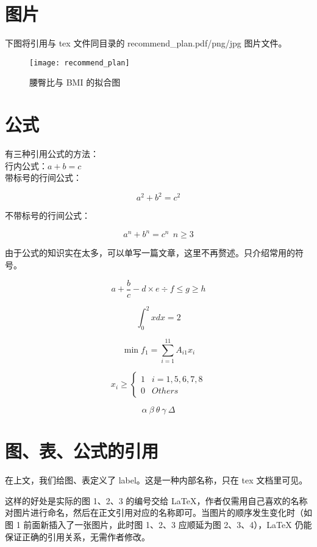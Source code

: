 \documentclass{article}
\begin{document}
\section{图片}

下图将引用与 tex 文件同目录的 recommend\_plan.pdf/png/jpg 图片文件。

\begin{figure}[!htbp]
	\centering
	\texttt{[image: recommend\_plan]}
	\caption{腰臀比与 BMI 的拟合图}
	\label{fig:whr-bmi}
\end{figure}

\section{公式}

有三种引用公式的方法：\\

行内公式：$a+b=c$\\

带标号的行间公式：

\begin{equation}
a^2 + b^2 = c^2
\label{gougu}
\end{equation}

不带标号的行间公式：

$$a^n+b^n=c^n \ \  n \geq 3$$

由于公式的知识实在太多，可以单写一篇文章，这里不再赘述。只介绍常用的符号。

$$a + \frac{b}{c} - d \times e \div f \leq g \geq h$$

$$\int_{0}^{2} xdx = 2$$

$$\min f_1 = \sum_{i=1}^{11} A_{i1}x_i$$

$$x_i \geq \begin{cases}
1 & i = 1, 5, 6, 7, 8\\
0 & Others
\end{cases}$$

$$\alpha \ \beta \ \theta \ \gamma \ \Delta$$


\section{图、表、公式的引用}

在上文，我们给图、表定义了 label。这是一种内部名称，只在 tex 文档里可见。

这样的好处是实际的图 1、2、3 的编号交给 LaTeX，作者仅需用自己喜欢的名称对图片进行命名，然后在正文引用对应的名称即可。当图片的顺序发生变化时（如图 1 前面新插入了一张图片，此时图 1、2、3 应顺延为图 2、3、4），LaTeX 仍能保证正确的引用关系，无需作者修改。
\end{document}
